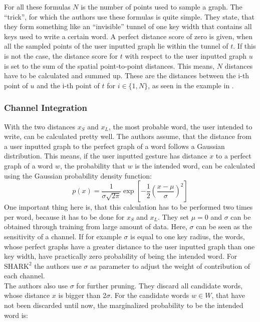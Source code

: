 For all these formulas $N$ is the number of points used to sample a graph. The ``trick'', for which the authors use these formulas is quite simple. They state, that they form something like an ``invisible'' tunnel of one key width that contains all keys used to write a certain word. A perfect distance score of zero is given, when all the sampled points of the user inputted graph lie within the tunnel of $t$. If this is not the case, the distance score for $t$ with respect to the user inputted graph $u$ is set to the sum of the spatial point-to-point distances. This means, $N$ distances have to be calculated and summed up. These are the distances between the i-th point of $u$ and the i-th point of $t$ for $i \in \{1,N\}$, as seen in the example in .

\subsubsection{Channel Integration}
With the two distances $x_S$ and $x_L$, the most probable word, the user intended to write, can be calculated pretty well. The authors assume, that the distance from a user inputted graph to the perfect graph of a word follows a Gaussian distribution. This means, if the user inputted gesture has distance $x$ to a perfect graph of a word $w$, the probability that $w$ is the intended word, can be calculated using the Gaussian probability density function:
\begin{equation}
    p(x) = \frac{1}{\sigma\sqrt{2\pi}}\exp\left[{-\frac{1}{2}}\left(\frac{x-\mu}{\sigma}\right)^2\right]
    \label{eqn:gaussian}
\end{equation}
One important thing here is, that this calculation has to be performed two times per word, because it has to be done for $x_S$ and $x_L$. They set $\mu = 0$ and $\sigma$ can be obtained through training from large amount of data. Here, $\sigma$ can be seen as the sensitivity of a channel. If for example $\sigma$ is equal to one key radius, the words, whose perfect graphs have a greater distance to the user inputted graph than one key width, have practically zero probability of being the intended word. For $\text{SHARK}^2$ the authors use $\sigma$ as parameter to adjust the weight of contribution of each channel.\\
The authors also use $\sigma$ for further pruning. They discard all candidate words, whose distance $x$ is bigger than 2$\sigma$. For the candidate words $w \in W$, that have not been discarded until now, the marginalized probability to be the intended word is: 
